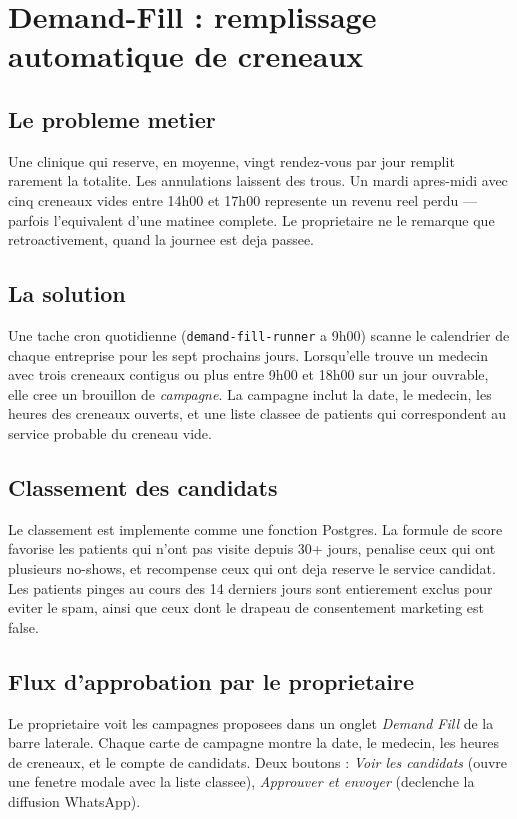 \section{Demand-Fill : remplissage automatique de creneaux}

\subsection{Le probleme metier}
Une clinique qui reserve, en moyenne, vingt rendez-vous par jour
remplit rarement la totalite. Les annulations laissent des trous. Un
mardi apres-midi avec cinq creneaux vides entre 14h00 et 17h00
represente un revenu reel perdu --- parfois l'equivalent d'une matinee
complete. Le proprietaire ne le remarque que retroactivement, quand la
journee est deja passee.

\subsection{La solution}
Une tache cron quotidienne (\texttt{demand-fill-runner} a 9h00) scanne
le calendrier de chaque entreprise pour les sept prochains jours.
Lorsqu'elle trouve un medecin avec trois creneaux contigus ou plus
entre 9h00 et 18h00 sur un jour ouvrable, elle cree un brouillon de
\emph{campagne}. La campagne inclut la date, le medecin, les heures
des creneaux ouverts, et une liste classee de patients qui
correspondent au service probable du creneau vide.

\subsection{Classement des candidats}
Le classement est implemente comme une fonction Postgres. La formule
de score favorise les patients qui n'ont pas visite depuis 30+ jours,
penalise ceux qui ont plusieurs no-shows, et recompense ceux qui ont
deja reserve le service candidat. Les patients pinges au cours des 14
derniers jours sont entierement exclus pour eviter le spam, ainsi que
ceux dont le drapeau de consentement marketing est false.

\subsection{Flux d'approbation par le proprietaire}
Le proprietaire voit les campagnes proposees dans un onglet
\emph{Demand Fill} de la barre laterale. Chaque carte de campagne
montre la date, le medecin, les heures de creneaux, et le compte de
candidats. Deux boutons : \emph{Voir les candidats} (ouvre une fenetre
modale avec la liste classee), \emph{Approuver et envoyer} (declenche
la diffusion WhatsApp).

